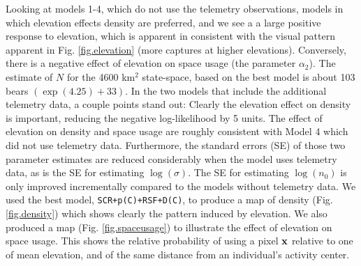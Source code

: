 Looking at  models 1-4, which do not use the telemetry observations,
models in which elevation effects density are preferred, and we see a 
a large positive response to elevation, which is apparent in 
consistent with the visual pattern apparent in
Fig. \ref{fig.elevation} (more captures at higher elevations).
Conversely, 
there is a negative effect of elevation on
space usage (the parameter $\alpha_{2}$). 
The estimate of $N$ for the 4600 km$^2$ state-space, based on the best
model is about 103 bears $(\exp(4.25)+33)$.
In the two models that include the additional telemetry data, a couple
points stand out: Clearly the elevation effect on density is
important, reducing the negative log-likelihood by 5 units. The effect
of elevation on density and space usage are roughly consistent with
Model 4 which did not use telemetry data. Furthermore, the standard
errors (SE) of those two parameter estimates are reduced considerably
when the model uses telemetry data, as is the SE for estimating
$\log(\sigma)$.  The SE for estimating $\log(n_{0})$ is only improved
incrementally compared to the models without telemetry data.  We used
the best model, \mbox{\tt SCR+p(C)+RSF+D(C)}, to produce a map of
density (Fig. \ref{fig.density}) which shows clearly the pattern
induced by elevation. We also produced a map
(Fig. \ref{fig.spaceusage}) to illustrate the effect of elevation on
space usage. This shows the relative probability of using a pixel
${\bf x}$ relative to one of mean elevation, and of the same distance
from an individual's activity center.


